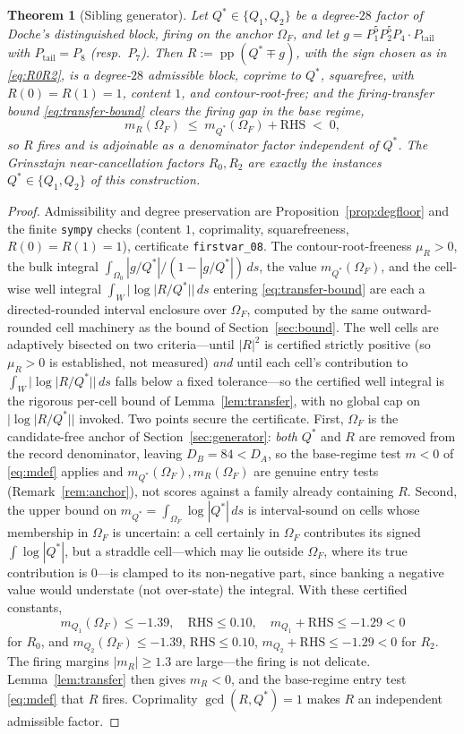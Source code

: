 \documentclass[11pt,reqno]{amsart}
\theoremstyle{plain}
\newtheorem{theorem}{Theorem}
\theoremstyle{definition}
\theoremstyle{remark}
\newcommand{\dA}{D_A}
\newcommand{\dB}{D_B}
\DeclareMathOperator{\pp}{pp}
\begin{document}
\begin{theorem}[Sibling generator]\label{thm:generator}
Let $Q^*\in\{Q_1,Q_2\}$ be a degree-$28$ factor of Doche's distinguished block, firing
on the anchor $\Omega_F$, and let $g=P_1^5P_2^5P_4\cdot P_{\mathrm{tail}}$ with
$P_{\mathrm{tail}}=P_8$ (resp.\ $P_7$). Then $R:=\pp(Q^*\mp g)$, with the sign chosen as
in \eqref{eq:R0R2}, is a degree-$28$ admissible block, coprime to $Q^*$, squarefree,
with $R(0)=R(1)=1$, content $1$, and contour-root-free; and the firing-transfer bound
\eqref{eq:transfer-bound} clears the firing gap in the base regime,
\[
  m_R(\Omega_F)\;\le\;m_{Q^*}(\Omega_F)+\mathrm{RHS}\;<\;0 ,
\]
so $R$ fires and is adjoinable as a denominator factor independent of $Q^*$. The
Grinsztajn near-cancellation factors $R_0,R_2$ are exactly the instances
$Q^*\in\{Q_1,Q_2\}$ of this construction.
\end{theorem}

\begin{proof}
Admissibility and degree preservation are Proposition~\ref{prop:degfloor} and the
finite \texttt{sympy} checks (content $1$, coprimality, squarefreeness, $R(0)=R(1)=1$),
certificate \texttt{firstvar\_08}. The contour-root-freeness $\mu_R>0$, the bulk
integral $\int_{\Omega_0}|g/Q^*|/(1-|g/Q^*|)\,ds$, the value
$m_{Q^*}(\Omega_F)$, and the cell-wise well integral
$\int_W|\log|R/Q^*||\,ds$ entering \eqref{eq:transfer-bound} are each a directed-rounded
interval enclosure over $\Omega_F$, computed by the same outward-rounded cell machinery
as the bound of Section~\ref{sec:bound}. The well cells are adaptively bisected on two
criteria---until $|R|^2$ is certified strictly positive (so $\mu_R>0$ is established, not
measured) \emph{and} until each cell's contribution to $\int_W|\log|R/Q^*||\,ds$ falls
below a fixed tolerance---so the certified well integral is the rigorous per-cell bound
of Lemma~\ref{lem:transfer}, with no global cap on $|\log|R/Q^*||$ invoked. Two points
secure the certificate. First, $\Omega_F$ is the candidate-free anchor of
Section~\ref{sec:generator}: \emph{both} $Q^*$ and $R$ are removed from the record
denominator, leaving $\dB=84<\dA$, so the base-regime test $m<0$ of \eqref{eq:mdef}
applies and $m_{Q^*}(\Omega_F),m_R(\Omega_F)$ are genuine entry tests
(Remark~\ref{rem:anchor}), not scores against a family already containing $R$. Second,
the upper bound on $m_{Q^*}=\int_{\Omega_F}\log|Q^*|\,ds$ is interval-sound on cells
whose membership in $\Omega_F$ is uncertain: a cell certainly in $\Omega_F$ contributes
its signed $\int\log|Q^*|$, but a straddle cell---which may lie outside $\Omega_F$, where
its true contribution is $0$---is clamped to its non-negative part, since banking a
negative value would understate (not over-state) the integral. With these
certified constants,
\[
  m_{Q_1}(\Omega_F)\le-1.39,\quad \mathrm{RHS}\le0.10,\quad
  m_{Q_1}+\mathrm{RHS}\le-1.29<0
\]
for $R_0$, and $m_{Q_2}(\Omega_F)\le-1.39$, $\mathrm{RHS}\le0.10$,
$m_{Q_2}+\mathrm{RHS}\le-1.29<0$ for $R_2$. The firing margins $|m_R|\ge1.3$ are
large---the firing is not delicate. Lemma~\ref{lem:transfer} then gives $m_R<0$, and the
base-regime entry test \eqref{eq:mdef} that $R$ fires. Coprimality $\gcd(R,Q^*)=1$ makes
$R$ an independent admissible factor.
\end{proof}
\end{document}
